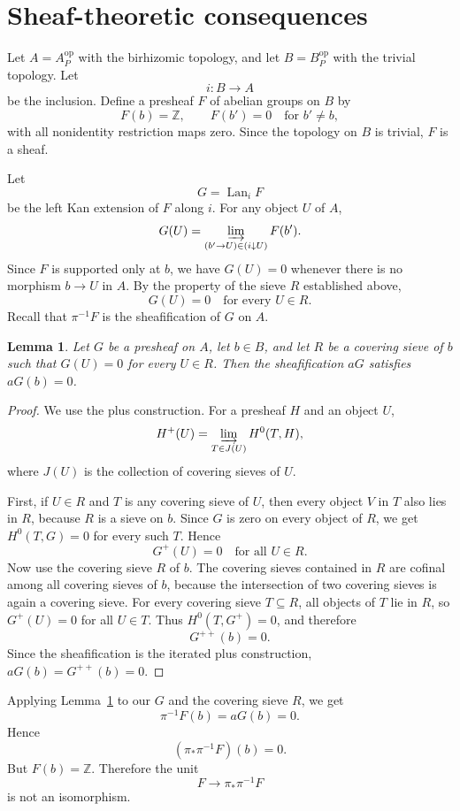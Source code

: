 \documentclass{article}
\newtheorem{lemma}{Lemma}
\theoremstyle{definition}
\newcommand{\Lan}{\operatorname{Lan}}
\newcommand{\bbZ}{\mathbb Z}
\begin{document}
\section{Sheaf-theoretic consequences}

Let $A=A_P^{\mathrm{op}}$ with the birhizomic topology, and let
$B=B_P^{\mathrm{op}}$ with the trivial topology.  Let
\[
i:B\longrightarrow A
\]
be the inclusion.  Define a presheaf $F$ of abelian groups on $B$ by
\[
F(b)=\bbZ,\qquad F(b')=0\quad\text{for }b'\neq b,
\]
with all nonidentity restriction maps zero.  Since the topology on $B$ is
trivial, $F$ is a sheaf.

Let
\[
G=\Lan_i F
\]
be the left Kan extension of $F$ along $i$.  For any object $U$ of $A$,
\[
G(U)=\varinjlim_{(b'\to U)\in (i\downarrow U)} F(b').
\]
Since $F$ is supported only at $b$, we have $G(U)=0$ whenever there is no
morphism $b\to U$ in $A$.  By the property of the sieve $R$ established above,
\[
G(U)=0\quad\text{for every }U\in R.
\]
Recall that $\pi^{-1}F$ is the sheafification of $G$ on $A$.

\begin{lemma}
\label{lem:vanish}
Let $G$ be a presheaf on $A$, let $b\in B$, and let $R$ be a covering sieve of
$b$ such that $G(U)=0$ for every $U\in R$.  Then the sheafification $aG$
satisfies $aG(b)=0$.
\end{lemma}

\begin{proof}
We use the plus construction.  For a presheaf $H$ and an object $U$,
\[
H^+(U)=\varinjlim_{T\in J(U)} H^0(T,H),
\]
where $J(U)$ is the collection of covering sieves of $U$.

First, if $U\in R$ and $T$ is any covering sieve of $U$, then every object
$V$ in $T$ also lies in $R$, because $R$ is a sieve on $b$.  Since $G$ is zero
on every object of $R$, we get $H^0(T,G)=0$ for every such $T$.  Hence
\[
G^+(U)=0\quad\text{for all }U\in R.
\]
Now use the covering sieve $R$ of $b$.  The covering sieves contained in $R$
are cofinal among all covering sieves of $b$, because the intersection of two
covering sieves is again a covering sieve.  For every covering sieve
$T\subseteq R$, all objects of $T$ lie in $R$, so $G^+(U)=0$ for all $U\in T$.
Thus $H^0(T,G^+)=0$, and therefore
\[
G^{++}(b)=0.
\]
Since the sheafification is the iterated plus construction, $aG(b)=G^{++}(b)=0$.
\end{proof}

Applying Lemma~\ref{lem:vanish} to our $G$ and the covering sieve $R$, we get
\[
\pi^{-1}F(b)=aG(b)=0.
\]
Hence
\[
(\pi_*\pi^{-1}F)(b)=0.
\]
But $F(b)=\bbZ$.  Therefore the unit
\[
F\longrightarrow \pi_*\pi^{-1}F
\]
is not an isomorphism.
\end{document}
